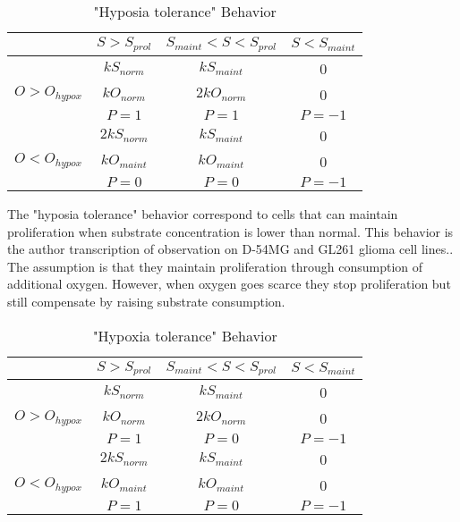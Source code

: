 \documentclass[11pt,a4paper]{article}
\begin{document}
\begin{table}[h!]
\begin{center}
\begin{tabular}{ |c|c|c|c| }
\hline
 & \textbf{$S>S_{prol}$} & \textbf{$S_{maint}<S<S_{prol}$} & \textbf{$S<S_{maint}$} \\
\hline
 & $kS_{norm}$    &  $kS_{maint}$   & 0  \\
$O> O_{hypox}$ &  $kO_{norm}$   & $2kO_{norm}$ &  0 \\
 &  $P = 1$ & $P = 1$ & $P=-1$ \\
\hline
  & $2kS_{norm}$ & $kS_{maint}$ & 0 \\
$O< O_{hypox}$ & $kO_{maint}$ & $kO_{maint}$ & 0 \\
 & $P=0$  & $P=0$ & $P=-1$ \\
\hline
\end{tabular}
\caption{"Hyposia tolerance" Behavior }
\end{center}
\end{table}

The "hyposia tolerance" behavior correspond to cells that can maintain proliferation when substrate concentration is lower than normal. This behavior is the author transcription of observation on D-54MG and GL261 glioma cell lines.\cite{Griguer2005}. The assumption is that they maintain proliferation through consumption of additional oxygen. However, when oxygen goes scarce they stop proliferation but still compensate by raising substrate consumption.  

\begin{table}[h!]
\begin{center}
\begin{tabular}{ |c|c|c|c| }
\hline
 & \textbf{$S>S_{prol}$} & \textbf{$S_{maint}<S<S_{prol}$} & \textbf{$S<S_{maint}$} \\
\hline
 & $kS_{norm}$    &  $kS_{maint}$   & 0  \\
$O> O_{hypox}$ &  $kO_{norm}$   & $2kO_{norm}$ &  0 \\
 &  $P = 1$ & $P = 0$ & $P=-1$ \\
\hline
  & $2kS_{norm}$ & $kS_{maint}$ & 0 \\
$O< O_{hypox}$ & $kO_{maint}$ & $kO_{maint}$ & 0 \\
 & $P=1$  & $P=0$ & $P=-1$ \\
\hline
\end{tabular}
\caption{"Hypoxia tolerance" Behavior }
\end{center}
\end{table}
\end{document}
